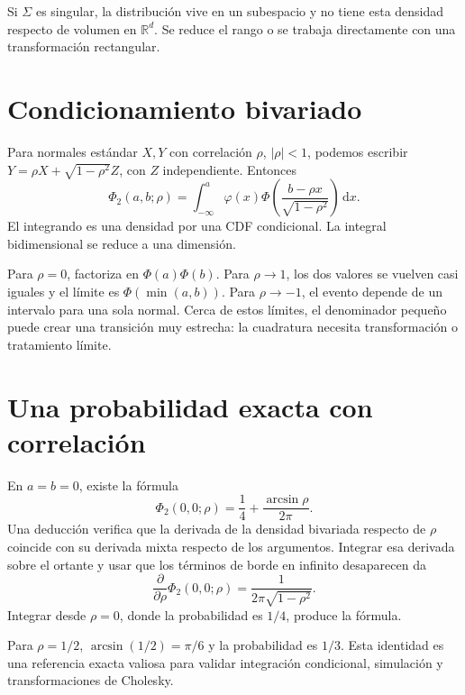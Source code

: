 \documentclass[11pt,a4paper]{article}
\newcommand{\R}{\mathbb R}
\newcommand{\dd}{\,\mathrm d}
\theoremstyle{definition}
\newcommand{\ph}{\varphi}
\begin{document}
Si $\Sigma$ es singular, la distribución vive en un subespacio y no tiene esta densidad respecto de volumen en $\R^d$. Se reduce el rango o se trabaja directamente con una transformación rectangular.

\section{Condicionamiento bivariado}
Para normales estándar $X,Y$ con correlación $\rho$, $|\rho|<1$, podemos escribir
$Y=\rho X+\sqrt{1-\rho^2}Z$, con $Z$ independiente. Entonces
\[
\Phi_2(a,b;\rho)=\int_{-\infty}^a
\ph(x)\Phi\left(\frac{b-\rho x}{\sqrt{1-\rho^2}}\right)\dd x.
\]
El integrando es una densidad por una CDF condicional. La integral bidimensional se reduce a una dimensión.

Para $\rho=0$, factoriza en $\Phi(a)\Phi(b)$. Para $\rho\to1$, los dos valores se vuelven casi iguales y el límite es $\Phi(\min(a,b))$. Para $\rho\to-1$, el evento depende de un intervalo para una sola normal. Cerca de estos límites, el denominador pequeño puede crear una transición muy estrecha: la cuadratura necesita transformación o tratamiento límite.

\section{Una probabilidad exacta con correlación}
En $a=b=0$, existe la fórmula
\[
\Phi_2(0,0;\rho)=\frac14+\frac{\arcsin\rho}{2\pi}.
\]
Una deducción verifica que la derivada de la densidad bivariada respecto de $\rho$ coincide con su derivada mixta respecto de los argumentos. Integrar esa derivada sobre el ortante y usar que los términos de borde en infinito desaparecen da
\[
\frac{\partial}{\partial\rho}\Phi_2(0,0;\rho)
=\frac1{2\pi\sqrt{1-\rho^2}}.
\]
Integrar desde $\rho=0$, donde la probabilidad es $1/4$, produce la fórmula.

Para $\rho=1/2$, $\arcsin(1/2)=\pi/6$ y la probabilidad es $1/3$. Esta identidad es una referencia exacta valiosa para validar integración condicional, simulación y transformaciones de Cholesky.
\end{document}
